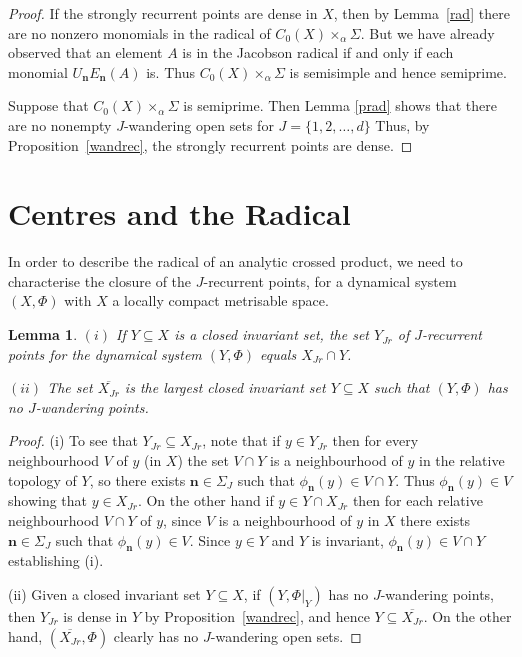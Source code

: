 \documentclass[12pt]{amsart}
\newtheorem{lemma}[theorem]{Lemma}
\theoremstyle{definition}
\newcommand{\bon}{\mathbf{n}}
\newcommand{\gS}{{\Sigma}}
\begin{document}
\begin{proof}
If the strongly recurrent points are dense in $X$, then by
Lemma~\ref{rad} there are no nonzero monomials in the radical of
$C_0(X)\times_\alpha\gS$. But we have already observed that an
element  $A$ is in the Jacobson radical if and only if each
monomial $U_\bon E_\bon(A)$ is. Thus $C_0(X)\times_\alpha\gS$
is semisimple and hence semiprime.

Suppose that $C_0(X)\times_\alpha\gS$ is semiprime. Then Lemma
\ref{prad} shows that there are no nonempty $J$-wandering open
sets for $J= \{1,2, \ldots,d \}$
Thus, by Proposition~\ref{wandrec}, the strongly recurrent points
are dense.
\end{proof}

\section{Centres and the Radical}

In order to describe the radical of an analytic crossed product,
we need to characterise the closure of the $J$-recurrent points,
for a dynamical system $(X,\Phi)$ with $X$ a locally compact
metrisable space.

\begin{lemma}\label{cent1}
$(i)$ If $Y\subseteq X$ is a closed invariant set, the set
$Y_{Jr}$ of $J$-recurrent points  for the dynamical system
$(Y,\Phi)$ equals $X_{Jr}\cap Y$.

$(ii)$ The set $\overline{X_{Jr}}$ is the largest closed invariant
set $Y\subseteq X$ such that $(Y,\Phi)$ has no $J$-wandering
points.
\end{lemma}

\begin{proof}
(i) To see
that $Y_{Jr}\subseteq X_{Jr}$, note that if $y\in Y_{Jr}$ then for
every neighbourhood $V$ of $y$ (in $X$) the set $V\cap Y$ is a
neighbourhood of $y$ in the relative topology of $Y$, so there
exists $\bon\in\gS_{J}$ such that $\phi_{\bon}(y)\in V\cap Y$.
Thus $\phi_{\bon}(y)\in V$ showing that $y\in X_{Jr}$. On the
other hand if $y\in Y\cap X_{Jr}$ then for each relative
neighbourhood $V\cap Y$ of $y$, since $V$ is a neighbourhood of
$y$ in $X$ there exists $\bon\in\gS_{J}$ such that
$\phi_{\bon}(y)\in V$. Since $y\in Y$ and $Y$ is invariant,
$\phi_{\bon}(y)\in V\cap Y$ establishing (i).

(ii) Given a closed invariant set $Y \subseteq X$, if $(Y,\Phi|_Y)$ has
no $J$-wandering points, then $Y_{Jr}$ is dense in $Y$ by
Proposition~\ref{wandrec}, and hence
$Y\subseteq\overline{X_{Jr}}$. On the other hand,
$(\overline{X_{Jr}},\Phi)$ clearly has no $J$-wandering open
sets.
\end{proof}
\end{document}
